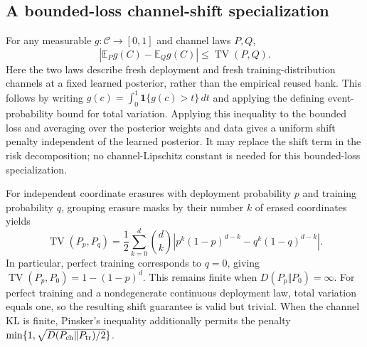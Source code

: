 \subsection{A bounded-loss channel-shift specialization}
For any measurable $g:\mathcal C\to[0,1]$ and channel laws $P,Q$,
\begin{equation}
  \left|\mathbb E_Pg(C)-\mathbb E_Qg(C)\right|
  \leq \operatorname{TV}(P,Q).
\end{equation}
Here the two laws describe fresh deployment and fresh training-distribution
channels at a fixed learned posterior, rather than the empirical reused bank.
This follows by writing
$g(c)=\int_0^1\mathbf1\{g(c)>t\}\,dt$ and applying the defining
event-probability bound for total variation. Applying this inequality to
the bounded loss and averaging over the posterior weights and data gives
a uniform shift penalty independent of the learned posterior. It may
replace the shift term in the risk decomposition; no channel-Lipschitz
constant is needed for this bounded-loss specialization.

For independent coordinate erasures with deployment probability $p$ and
training probability $q$, grouping erasure masks by their number $k$ of
erased coordinates yields
\begin{equation}
  \operatorname{TV}(P_p,P_q)
  =\frac12\sum_{k=0}^{d}\binom dk
  \left|p^k(1-p)^{d-k}-q^k(1-q)^{d-k}\right|.
\end{equation}
In particular, perfect training corresponds to $q=0$, giving
$\operatorname{TV}(P_p,P_0)=1-(1-p)^d$. This remains finite when
$D(P_p\Vert P_0)=\infty$. For perfect training and a nondegenerate
continuous deployment law, total variation equals one, so the resulting
shift guarantee is valid but trivial. When the channel KL is finite,
Pinsker's inequality additionally permits the penalty
$\min\{1,\sqrt{D(P_{\rm ch}\Vert P_{\rm tr})/2}\}$.
